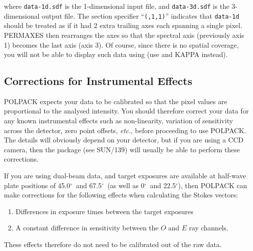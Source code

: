\documentclass[twoside,11pt]{starlink}
\providecommand{\dgs}{\hbox{$^\circ$}}
\begin{document}
\begin{terminalv}
\end{terminalv}

where \texttt{data-1d.sdf} is the 1-dimensional input file, and \texttt{data-3d.sdf} is the 3-dimensional output file. The section specifier
``\texttt{(,1,1)}'' indicates that \texttt{data-1d} should be treated as if it
had 2 extra trailing axes each spanning a single pixel. PERMAXES then
rearranges the axes so that the spectral axis (previously axis 1) becomes
the last axis (axis 3). Of course, since there is no spatial coverage,
you will not be able to display such data using 
(use  and KAPPA 
instead).

\subsection{\label{SEC:CCDPACK}Corrections for Instrumental Effects}
POLPACK expects your data to be calibrated so that the pixel values are
proportional to the analysed intensity. You should therefore correct your
data for any known instrumental effects such as non-linearity, variation
of sensitivity across the detector, zero point offsets, \emph{etc.}, before
proceeding to use POLPACK. The details will obviously depend on your
detector, but if you are using a CCD camera, then the 
package (see SUN/139) will usually be able to perform these corrections.

If you are using dual-beam data, and target exposures are available at
half-wave plate positions of
45.0\dgs\ and 67.5\dgs\ (as well as 0\dgs\ and 22.5\dgs), then POLPACK can
make corrections for the following effects when calculating the Stokes
vectors:

\begin{enumerate}
\item Differences in exposure times between the target exposures
\item A constant difference in sensitivity between the $O$ and $E$ ray
channels.
\end{enumerate}

These effects therefore do not need to be calibrated out of the raw data.
\end{document}
